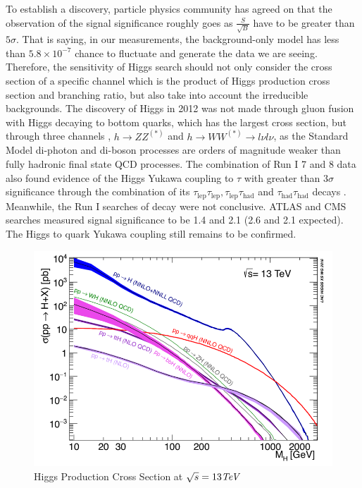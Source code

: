 To establish a discovery, particle physics community has agreed on that the observation of the signal significance roughly goes as $\frac{S}{\sqrt{B}}$ have to be greater than $5\sigma$. That is saying, in our measurements, the background-only model has less than $5.8\times 10^{-7}$ chance to fluctuate and generate the data we are seeing. Therefore, the sensitivity of Higgs search should not only consider the cross section of a specific channel which is the product of Higgs production cross section and branching ratio, but also take into account the irreducible backgrounds. The discovery of Higgs in 2012 was not made through gluon fusion with Higgs decaying to bottom quarks, which has the largest cross section, but through three channels \Hgammagamma, $h\rightarrow ZZ^{(*)}$ and $h\rightarrow WW^{(*)}\rightarrow l\nu l\nu$\cite{HIGG-2012-27,CMS-HIG-12-028}, as the Standard Model di-photon and di-boson processes are orders of magnitude weaker than fully hadronic final state QCD processes. The combination of Run I 7 and 8 \tev data also found evidence of the Higgs Yukawa coupling to $\tau$ with greater than $3\sigma$ significance through the combination of its $\tau_{\text{lep}}\tau_{\text{lep}},\tau_{\text{lep}}\tau_{\text{had}}$ and $\tau_{\text{had}}\tau_{\text{had}}$ decays \cite{HIGG-2013-32,CMS-HIG-13-004}. Meanwhile, the Run I searches of \Hbb decay were not conclusive. ATLAS and CMS searches measured signal significance to be 1.4 and 2.1 (2.6 and 2.1 expected)\cite{HIGG-2013-23,CMS-HIG-13-012}. The Higgs to quark Yukawa coupling still remains to be confirmed. 



\begin{figure}[htpb!]
\begin{center}
  \includegraphics[width=0.6\linewidth]{figures/theory/HiggsCrossSection.png}
\caption{Higgs Production Cross Section at $\sqrt{s}= 13\textit{TeV}$}
\label{fig:theory-higgsp}
\end{center}
\end{figure}

